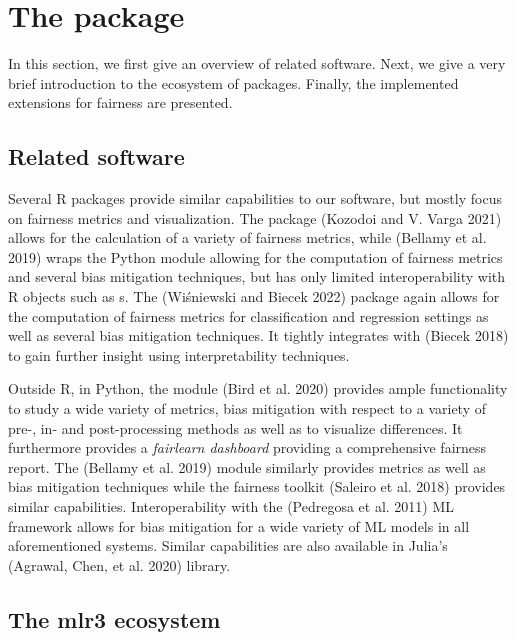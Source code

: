 \hypertarget{main}{%
\section{\texorpdfstring{The  package}{The  package}}\label{main}}

In this section, we first give an overview of related software.
Next, we give a very brief introduction to the  ecosystem of packages.
Finally, the implemented extensions for fairness are presented.

\hypertarget{related}{%
\subsection{Related software}\label{related}}

Several R packages provide similar capabilities to our software, but mostly focus on fairness metrics and visualization.
The  package (Kozodoi and V. Varga 2021) allows for the calculation of a variety of fairness metrics, while  (Bellamy et al. 2019) wraps the Python  module allowing for the computation of fairness metrics and several bias mitigation techniques, but has only limited interoperability with R objects such as s.
The  (Wiśniewski and Biecek 2022) package again allows for the computation of fairness metrics for classification and regression settings as well as several bias mitigation techniques.
It tightly integrates with  (Biecek 2018) to gain further insight using interpretability techniques.

Outside R, in Python, the  module (Bird et al. 2020) provides ample functionality to study a wide variety of metrics, bias mitigation with respect to a variety of pre-, in- and post-processing methods as well as to visualize differences.
It furthermore provides a \emph{fairlearn dashboard} providing a comprehensive fairness report.
The  (Bellamy et al. 2019) module similarly provides metrics as well as bias mitigation techniques while the  fairness toolkit (Saleiro et al. 2018) provides similar capabilities.
Interoperability with the  (Pedregosa et al. 2011) ML framework allows for bias mitigation for a wide variety of ML models in all aforementioned systems.
Similar capabilities are also available in Julia's  (Agrawal, Chen, et al. 2020) library.

\hypertarget{mlr3}{%
\subsection{The mlr3 ecosystem}\label{mlr3}}

